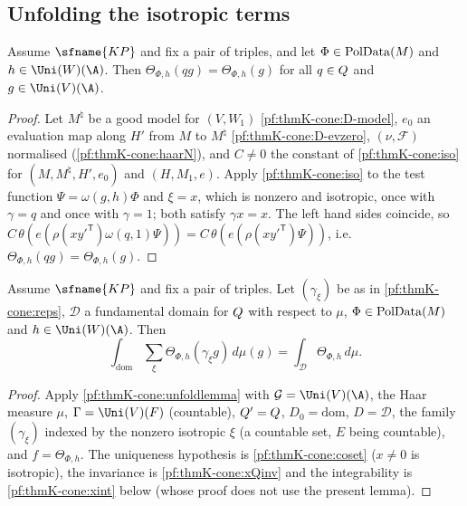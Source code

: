 \subsection{Unfolding the isotropic terms}\label{pf:thmK-cone:unfold}

\begin{lemma}\label{pf:thmK-cone:xQinv}
Assume $\sfname{KP}$ and fix a pair of triples, and let $\Phi\in\operatorname{PolData}(M)$ and $h\in\Uni(W)(\A)$.  Then
$\Theta_{\Phi,h}(qg)=\Theta_{\Phi,h}(g)$ for all $q\in Q$ and $g\in\Uni(V)(\A)$.
\end{lemma}

\begin{proof}
Let $M^\natural$ be a good model for $(V,W_1)$ \ref{pf:thmK-cone:D-model}, $e_0$ an evaluation map along $H'$ from $M$ to
$M^\natural$ \ref{pf:thmK-cone:D-evzero}, $(\nu,\mathcal F)$ normalised (\cref{pf:thmK-cone:haarN}), and $C\neq0$ the
constant of \cref{pf:thmK-cone:iso} for $(M,M^\natural,H',e_0)$ and $(H,M_1,e)$.  Apply \cref{pf:thmK-cone:iso} to the
test function $\Psi=\omega(g,h)\Phi$ and $\xi=x$, which is nonzero and isotropic, once with $\gamma=q$ and once with
$\gamma=1$; both satisfy $\gamma x=x$.  The left hand sides coincide, so
$C\,\theta(e(\rho(xy'^{\mathsf T})\omega(q,1)\Psi))=C\,\theta(e(\rho(xy'^{\mathsf T})\Psi))$, i.e.\
$\Theta_{\Phi,h}(qg)=\Theta_{\Phi,h}(g)$.
\end{proof}

\begin{lemma}[Unfolding]\label{pf:thmK-cone:unfoldx}
Assume $\sfname{KP}$ and fix a pair of triples.  Let $(\gamma_\xi)$ be as in \cref{pf:thmK-cone:reps}, $\mathcal D$ a fundamental
domain for $Q$ with respect to $\mu$, $\Phi\in\operatorname{PolData}(M)$ and $h\in\Uni(W)(\A)$.  Then
\[
  \int_{\mathrm{dom}}\sum_\xi\Theta_{\Phi,h}(\gamma_\xi g)\,d\mu(g)=\int_{\mathcal D}\Theta_{\Phi,h}\,d\mu .
\]
\end{lemma}

\begin{proof}
Apply \cref{pf:thmK-cone:unfoldlemma} with $\mathcal G=\Uni(V)(\A)$, the Haar measure $\mu$, $\Gamma=\Uni(V)(F)$ (countable),
$Q'=Q$, $D_0=\mathrm{dom}$, $D=\mathcal D$, the family $(\gamma_\xi)$ indexed by the nonzero isotropic
$\xi$ (a countable set, $E$ being countable), and $f=\Theta_{\Phi,h}$.  The uniqueness hypothesis is
\cref{pf:thmK-cone:coset} ($x\neq0$ is isotropic), the invariance is \cref{pf:thmK-cone:xQinv} and the integrability is
\cref{pf:thmK-cone:xint} below (whose proof does not use the present lemma).
\end{proof}


